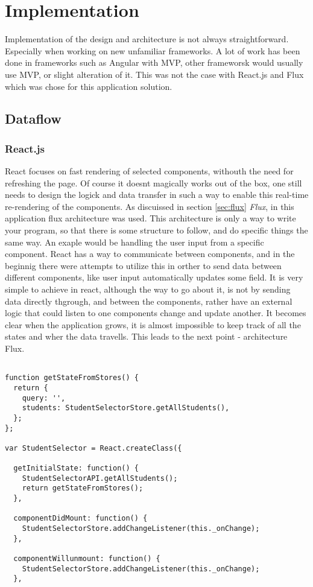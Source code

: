 \chapter{Implementation}
Implementation of the design and architecture is not always straightforward. Especially when working on new unfamiliar frameworks. A lot of work has been done in frameworks such as Angular with MVP, other frameworsk would usually use MVP, or slight alteration of it. This was not the case with React.js and Flux which was chose for this application solution.
\section{Dataflow}
\subsection{React.js}
React focuses on fast rendering of selected components, withouth the need for refreshing the page. Of course it doesnt magically works out of the box, one still needs to design the logick and data transfer in such a way to enable this real-time re-rendering of the components. As discuissed in section \ref{sec:flux} \emph{Flux}, in this application flux architecture was used. This architecture is only a way to write your program, so that there is some structure to follow, and do specific things the same way. An exaple would be handling the user input from a specific component. React has a way to communicate between components, and in the beginnig there were attempts to utilize this in orther to send data between different components, like user input automatically updates some field. It is very simple to achieve in react, although the way to go about it, is not by sending data directly thgrough, and between the components, rather have an external logic that could listen to one components change and update another. It becomes clear when the application grows, it is almost impossible to keep track of all the states and wher the data travells. This leads to the next point - architecture Flux.


\begin{lstlisting}

function getStateFromStores() {
  return {
    query: '',
    students: StudentSelectorStore.getAllStudents(),
  };
};

var StudentSelector = React.createClass({

  getInitialState: function() {
    StudentSelectorAPI.getAllStudents();
    return getStateFromStores();
  },

  componentDidMount: function() {
    StudentSelectorStore.addChangeListener(this._onChange);
  },

  componentWillunmount: function() {
    StudentSelectorStore.addChangeListener(this._onChange);
  },

\end{lstlisting}

